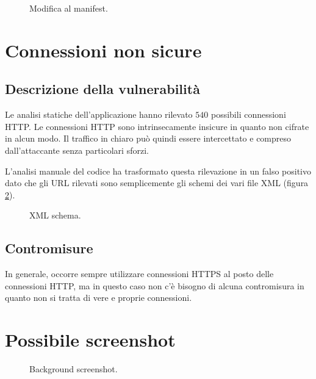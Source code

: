 \begin{figure}[h]
	\centering 
	\caption{Modifica al manifest.}
	\label{fig:pinningFile}
\end{figure}

\section{Connessioni non sicure}

\subsection{Descrizione della vulnerabilità}
Le analisi statiche dell'applicazione hanno rilevato $540$ possibili connessioni \ac{HTTP}. Le connessioni \ac{HTTP} sono intrinsecamente insicure in quanto non cifrate in alcun modo. Il traffico in chiaro può quindi essere intercettato e compreso dall'attaccante senza particolari sforzi.

L'analisi manuale del codice ha trasformato questa rilevazione in un falso positivo dato che gli \ac{URL} rilevati sono semplicemente gli schemi dei vari file \ac{XML} (figura \ref{fig:schema}).

\begin{figure}[h]
	\centering 
	\caption{XML schema.}
	\label{fig:schema}
\end{figure}

\subsection{Contromisure}
In generale, occorre sempre utilizzare connessioni \ac{HTTPS} al posto delle connessioni \ac{HTTP}, ma in questo caso non c'è bisogno di alcuna contromisura in quanto non si tratta di vere e proprie connessioni.

\section{Possibile screenshot}

\begin{figure}[h]
	\centering 
	\caption{Background screenshot.}
	\label{fig:background}
\end{figure}

